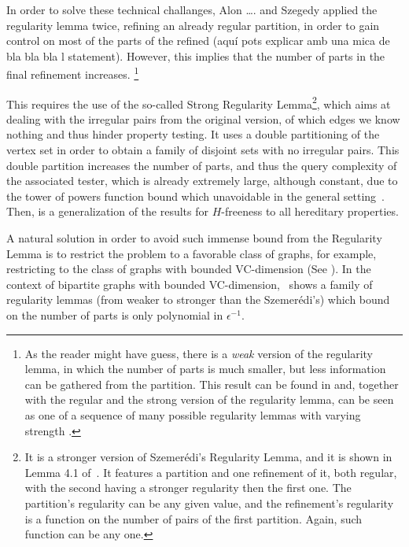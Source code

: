     In order to solve these technical challanges, Alon …. and Szegedy \cite[Theorem~]{} applied the regularity lemma
    twice, refining an already regular partition, in order to gain control on most of the parts of the refined
    (aquí pots explicar amb una mica de bla bla bla l statement).
    However, this implies that the number of parts in the final refinement increases.
    \footnote{As the reader might have guess, there is a \emph{weak} version of the regularity lemma, in which the
        number of parts is much smaller, but less information can be gathered from the partition. This result can be found
        in \cite{} and, together with the regular and the strong version of the regularity lemma, can be seen as one of a
        sequence of many possible regularity lemmas with varying strength \cite{regulary lemma for the analyst, lov szegedy}.}

    This requires the use of the so-called Strong Regularity Lemma\footnote{It is a
        stronger version of Szemer\'edi's Regularity Lemma, and it is shown in Lemma 4.1 of~\cite{efficient_testing_of_large_graphs}.
        It features a partition and one refinement of it, both regular,
        with the second having a stronger regularity then the first one.
        The partition's regularity can be any given value, and the refinement's regularity is a function
        on the number of pairs of the first partition.
        Again, such function can be any  one.},
    which aims at dealing with the irregular
    pairs from the original version, of which edges we know nothing and thus hinder property testing.
    It uses a double partitioning of the vertex set in order to obtain a family of disjoint sets
    with no irregular pairs.
    This double partition increases the number of parts, and thus the query complexity of the associated tester, which
    is already extremely large, although constant, due to the tower of powers function bound which unavoidable in the
    general setting~\cite{lower_bounds_of_tower_type_for_szeremedis_uniformity_lemma}.
    Then,  is a generalization of the results for $H$-freeness to all
    hereditary properties.

    A natural solution in order to avoid such immense bound from the Regularity Lemma is to restrict the problem
    to a favorable class of graphs, for example, restricting to the class of graphs with bounded VC-dimension
    (See ).
    In the context of bipartite graphs with bounded VC-dimension,~\cite{efficient_testing_of_bipartite_graphs_for_forbidden_induced_subgraphs}
    shows a family of regularity lemmas (from weaker to stronger than the Szemer\'edi's) which bound on the number of parts
    is only polynomial in $\epsilon^{-1}$.

